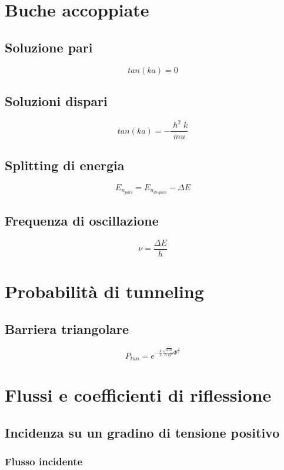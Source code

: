 \documentclass[10pt,a4paper]{report}
\begin{document}
\chapter{Buche accoppiate}

	\section{Soluzione pari}
		\[
		tan(ka)=0
		\]
	\section{Soluzioni dispari}
		\[
		tan(ka)= - \frac {\hslash ^ 2 k} {m u}
		\]
	\section{Splitting di energia}
		\[
		E_{n_{pari}}=E_{n_{dispari}} - \Delta E
		\]
	\section{Frequenza di oscillazione}
		\[
		\nu=\frac{\Delta E}{h} 
		\]



\chapter{Probabilità di tunneling}

	\section{Barriera triangolare}

	\begin{equation}
	P_{tun}=e^{-\frac{4}{3} \frac { \sqrt{2m} } {\hslash q F} \Phi^ { \frac {3} {2} } }
	\end{equation}
	
\chapter{Flussi e coefficienti di riflessione}

	\section{Incidenza su un gradino di tensione positivo}

		\subsection{Flusso incidente}
\end{document}
